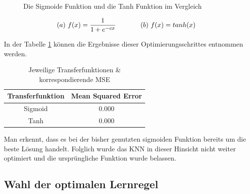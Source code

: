 \begin{figure}[H]
\hfill
{}
\hfill
{}
\hfill
\caption{Die Sigmoide Funktion und die Tanh Funktion im Vergleich}
\label{fig:sigtanh}
\end{figure}

\begin{equation}\formelentry{Sigmoide Funktion sowie Tanh Funktion}
(a)\ f(x)= \frac{1}{1+e^{-cx}}\ \ \ \ \ \ \ \ \ \ \ (b)\ f(x)= tanh(x)
\end{equation}


In der Tabelle  \ref{tab:TRANSMSE} können die Ergebnisse dieser Optimierungsschrittes entnommen werden.


\begin{table}[H]
  \centering
  \begin{tabular}{|c|c|}
  \hline 
  \rule[0ex]{0pt}{2.5ex} Transferfunktion & Mean Squared Error \\ 
  \hline 
  \rule[0ex]{0pt}{2.5ex} Sigmoid & 0.000 \\ 
  \hline 
  \rule[0ex]{0pt}{2.5ex} Tanh & 0.000 \\ 
  \hline 
  \end{tabular} 
  \caption{Jeweilige Transferfunktionen \& korrespondierende MSE}
  \label{tab:TRANSMSE}
\end{table}

Man erkennt, dass es bei der bisher genutzten sigmoiden Funktion bereits um die beste Lösung handelt. Folglich wurde das KNN in dieser Hinsicht nicht weiter optimiert und die ursprüngliche Funktion wurde belassen.

\subsection{Wahl der optimalen Lernregel}
\label{subsection:Wahl der optimalen Lernregel}

